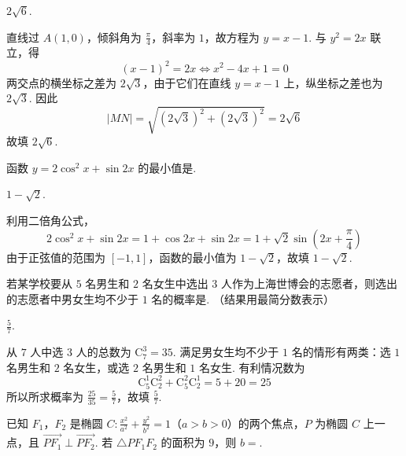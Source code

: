 \begin{answer}
\(2\sqrt{6}\).
\end{answer}

\begin{solution}
直线过 \(A(1,0)\)，倾斜角为 \(\frac\pi4\)，斜率为 \(1\)，故方程为 \(y=x-1\). 与 \(y^2=2x\) 联立，得
\[
(x-1)^2=2x\iff x^2-4x+1=0
\]
两交点的横坐标之差为 \(2\sqrt3\)，由于它们在直线 \(y=x-1\) 上，纵坐标之差也为 \(2\sqrt3\). 因此
\[
|MN|=\sqrt{(2\sqrt3)^2+(2\sqrt3)^2}=2\sqrt6
\]
故填 \(2\sqrt6\).
\end{solution}

\begin{problem}
函数 \(y = 2\cos^2 x + \sin 2x\) 的最小值是\fillinblank{}.
\end{problem}

\begin{answer}
\(1-\sqrt{2}\).
\end{answer}

\begin{solution}
利用二倍角公式，
\[
2\cos^2x+\sin2x=1+\cos2x+\sin2x=1+\sqrt2\sin\left(2x+\frac\pi4\right)
\]
由于正弦值的范围为 \([-1,1]\)，函数的最小值为 \(1-\sqrt2\)，故填 \(1-\sqrt2\).
\end{solution}

\begin{problem}
若某学校要从 \(5\) 名男生和 \(2\) 名女生中选出 \(3\) 人作为上海世博会的志愿者，则选出的志愿者中男女生均不少于 \(1\) 名的概率是\fillinblank{}. （结果用最简分数表示）
\end{problem}

\begin{answer}
\(\frac{5}{7}\).
\end{answer}

\begin{solution}
从 \(7\) 人中选 \(3\) 人的总数为 \(\mathrm C_7^3=35\). 满足男女生均不少于 \(1\) 名的情形有两类：选 \(1\) 名男生和 \(2\) 名女生，或选 \(2\) 名男生和 \(1\) 名女生. 有利情况数为
\[
\mathrm C_5^1\mathrm C_2^2+\mathrm C_5^2\mathrm C_2^1=5+20=25
\]
所以所求概率为 \(\frac{25}{35}=\frac57\)，故填 \(\frac57\).
\end{solution}

\begin{problem}
已知 \(F_1\)，\(F_2\) 是椭圆 \(C: \frac{x^2}{a^2} + \frac{y^2}{b^2} = 1\)（\(a > b > 0\)）的两个焦点，\(P\) 为椭圆 \(C\) 上一点，且 \(\overrightarrow{PF_1} \perp \overrightarrow{PF_2}\). 若 \(\triangle PF_1F_2\) 的面积为 \(9\)，则 \(b =\)\fillinblank{}.
\end{problem}

